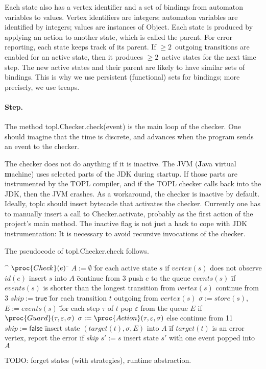 \documentclass{article} %
\begin{document}
Each state also has a vertex identifier and a set of bindings from automaton variables to values.
Vertex identifiers are integers; automaton variables are identified by integers; values are instances of \textsf{Object}.
Each state is produced by applying an action to another state, which is called the parent.
For error reporting, each state keeps track of its parent.
If $\ge2$~outgoing transitions are enabled for an active state, then it produces $\ge2$~active states for the next time step.
The new active states and their parent are likely to have similar sets of bindings.
This is why we use persistent (functional) sets for bindings; more precisely, we use treaps.

\paragraph{Step.}
The method \textsf{topl.Checker.check(event)} is the main loop of the checker.
One should imagine that the time is discrete, and advances when the program sends an event to the checker.

The checker does not do anything if it is inactive.
The JVM (\textbf Java \textbf virtual \textbf machine) uses selected parts of the JDK during startup.
If those parts are instrumented by the TOPL compiler, and if the TOPL checker calls back into the JDK, then the JVM crashes.
As a workaround, the checker is inactive by default.
Ideally, \textsf{toplc} should insert bytecode that activates the checker.
Currently one has to manually insert a call to \textsf{Checker.activate}, probably as the first action of the project's \textsf{main} method.
The inactive flag is not just a hack to cope with JDK instrumentation:
It is necessary to avoid recursive invocations of the checker.

The pseudocode of \textsf{topl.Checker.check} follows.

\begin{alg}
\^  $\proc{Check}(e)$
\=  $A := \emptyset$
\=  for each active state $s$
\+    if $\mathit{vertex}(s)$ does not observe $\mathit{id}(e)$
\+      insert $s$ into $A$
\=      continue from $3$
\-    push $e$ to the queue $\mathit{events}(s)$
\=    if $\mathit{events}(s)$ is shorter than the longest transition from $\mathit{vertex}(s)$
\+      continue from $3$
\1    $\mathit{skip}:=\mathsf{true}$
\=    for each transition $t$ outgoing from $\mathit{vertex}(s)$
\+      $\sigma := \mathit{store}(s)$,\quad $E := \mathit{events}(s)$
\=      for each step $\tau$ of $t$
\+        pop $\varepsilon$ from the queue $E$
\+        if $\proc{Guard}(\tau, \varepsilon, \sigma)$
\+          $\sigma := \proc{Action}(\tau, \varepsilon, \sigma)$
\-        else
\+          continue from 11
\2      $\mathit{skip}:=\mathsf{false}$
\=      insert state $(\mathit{target}(t), \sigma, E)$ into $A$
\=      if $\mathit{target}(t)$ is an error vertex, report the error
\=      if \textit{skip}
\+        $s' := s$
\=        insert state $s'$ with one event popped into $A$
\end{alg}

TODO: forget states (with strategies), runtime abstraction.

\end{document}

